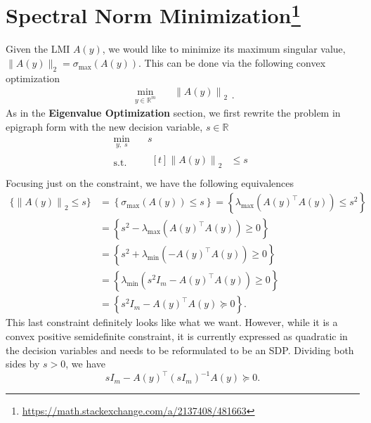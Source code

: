 \documentclass[a4paper]{article}
\begin{document}
\section*{Spectral Norm Minimization\footnote{\url{https://math.stackexchange.com/a/2137408/481663}}}
Given the LMI $A(y)$, we would like to minimize its maximum singular value, $\|A(y)\|_2=\sigma_{\max}\left(A(y)\right)$.
This can be done via the following convex optimization
\begin{equation}\label{eq:spectral-min}
\begin{split}
\min_{y\in\mathbb{R}^m}  \quad & \left\lVert A(y)\right\rVert_2
\end{split}.
\end{equation}
As in the \textbf{Eigenvalue Optimization} section, we first rewrite the problem in epigraph form with the new decision variable, $s\in\mathbb{R}$
\begin{equation}\label{eq:spectral-min-epigraph}
\begin{split}
\min_{y,\;s}   \quad & s \\
\textrm{s.t.} \quad &
  \begin{aligned}[t]
    \left\lVert A(y)\right\rVert_2 &\le s\\
  \end{aligned}
\end{split}
\end{equation}
Focusing just on the constraint, we have the following equivalences
\begin{align*}
\{\left\lVert A(y)\right\rVert_2 \le s\}
&= \left\{\sigma_{\max}\left(A(y)\right) \le s\right\} = \left\{\lambda_{\max}\left(A(y)^\top A(y)\right) \le s^2\right\} \\
&= \left\{s^2 - \lambda_{\max}\left(A(y)^\top A(y)\right) \ge 0\right\} \\
&= \left\{s^2 + \lambda_{\min}\left(-A(y)^\top A(y)\right) \ge 0\right\} \\
&= \left\{\lambda_{\min}\left(s^2 I_m - A(y)^\top A(y)\right) \ge 0\right\} \\
&= \left\{s^2 I_m - A(y)^\top A(y) \succeq 0\right\}.
\end{align*}
This last constraint definitely looks like what we want.
However, while it is a convex positive semidefinite constraint, it is currently expressed as quadratic in the decision variables and needs to be reformulated to be an SDP.
Dividing both sides by $s>0$, we have
\begin{equation}\label{eq:schur-constraint}
s I_m - A(y)^\top (sI_m)^{-1} A(y) \succeq 0.
\end{equation}
\end{document}
